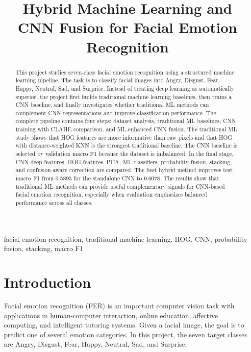 \documentclass[conference]{IEEEtran}
\title{Hybrid Machine Learning and CNN Fusion for Facial Emotion Recognition}
\author{
\IEEEauthorblockN{ }
\IEEEauthorblockA{
Department of Data Science\\
Beijing Normal University-Hong Kong Baptist University United International College\\
Zhuhai, China\\
}
}
\begin{document}
\maketitle

\begin{abstract}
This project studies seven-class facial emotion recognition using a structured
machine learning pipeline. The task is to classify facial images into Angry,
Disgust, Fear, Happy, Neutral, Sad, and Surprise. Instead of treating deep
learning as automatically superior, the project first builds traditional
machine learning baselines, then trains a CNN baseline, and finally investigates
whether traditional ML methods can complement CNN representations and improve
classification performance. The complete pipeline contains four steps: dataset
analysis, traditional ML baselines, CNN training with CLAHE comparison, and
ML-enhanced CNN fusion. The traditional ML study shows that HOG features are
more informative than raw pixels and that HOG with distance-weighted KNN is the
strongest traditional baseline. The CNN baseline is selected by validation
macro F1 because the dataset is imbalanced. In the final stage, CNN deep
features, HOG features, PCA, ML classifiers, probability fusion, stacking, and
confusion-aware correction are compared. The best hybrid method improves test
macro F1 from 0.5893 for the standalone CNN to 0.6078. The results show that
traditional ML methods can provide useful complementary signals for CNN-based
facial emotion recognition, especially when evaluation emphasizes balanced
performance across all classes.
\end{abstract}

\begin{IEEEkeywords}
facial emotion recognition, traditional machine learning, HOG, CNN, probability
fusion, stacking, macro F1
\end{IEEEkeywords}

\section{Introduction}

Facial emotion recognition (FER) is an important computer vision task with
applications in human-computer interaction, online education, affective
computing, and intelligent tutoring systems. Given a facial image, the goal is
to predict one of several emotion categories. In this project, the seven target
classes are Angry, Disgust, Fear, Happy, Neutral, Sad, and Surprise.
\end{document}
